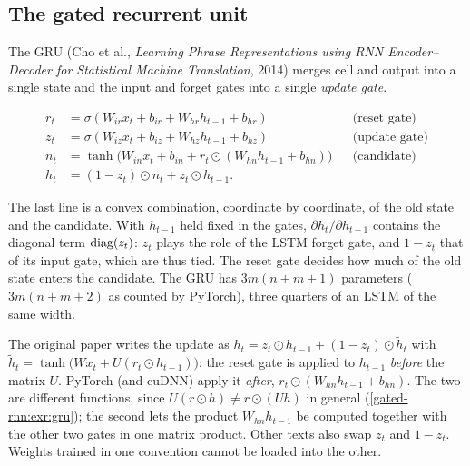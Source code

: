 \begin{notechapter}
\section{The gated recurrent unit}\label{gated-rnn:sec:gru}

The GRU (Cho et al., \emph{Learning Phrase Representations using RNN
Encoder--Decoder for Statistical Machine Translation}, 2014) merges cell and output into a single state and the input and
forget gates into a single \emph{update gate}.

\begin{definition}\label{gated-rnn:def:gru}
\begin{align*}
  r_t &= \sigma(W_{ir}x_t + b_{ir} + W_{hr}h_{t-1} + b_{hr}) &&\text{(reset gate)}\\
  z_t &= \sigma(W_{iz}x_t + b_{iz} + W_{hz}h_{t-1} + b_{hz}) &&\text{(update gate)}\\
  n_t &= \tanh\bigl(W_{in}x_t + b_{in} + r_t\odot(W_{hn}h_{t-1} + b_{hn})\bigr) &&\text{(candidate)}\\
  h_t &= (1 - z_t)\odot n_t + z_t\odot h_{t-1} .
\end{align*}
\end{definition}

The last line is a convex combination, coordinate by coordinate, of the old state and the
candidate. With $h_{t-1}$ held fixed in the gates, $\partial h_t/\partial h_{t-1}$ contains the diagonal term $\operatorname{diag}(z_t)$: $z_t$
plays the role of the LSTM forget gate, and $1 - z_t$ that of its input gate, which are thus tied.
The reset gate decides how much of the old state enters the candidate. The GRU has $3m(n + m + 1)$
parameters ($3m(n + m + 2)$ as counted by PyTorch), three quarters of an LSTM of the same width.

\begin{pitfall}
The original paper writes the update as $h_t = z_t\odot h_{t-1} + (1 - z_t)\odot\tilde h_t$ with
$\tilde h_t = \tanh\bigl(Wx_t + U(r_t\odot h_{t-1})\bigr)$: the reset gate is applied to $h_{t-1}$ \emph{before} the matrix $U$.
PyTorch (and cuDNN) apply it \emph{after}, $r_t\odot(W_{hn}h_{t-1} + b_{hn})$. The two are different functions,
since $U(r\odot h)\neq r\odot(Uh)$ in general (\cref{gated-rnn:exr:gru}); the second lets the product $W_{hn}h_{t-1}$ be computed
together with the other two gates in one matrix product. Other texts also swap $z_t$ and $1 - z_t$.
Weights trained in one convention cannot be loaded into the other.
\end{pitfall}


\end{notechapter}
